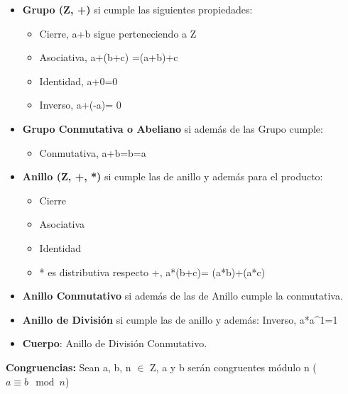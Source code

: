 \documentclass[12pt, twoside, openright]{report} %
\begin{document}
  \begin{itemize}
  \item \textbf{Grupo (Z, +)} si cumple las siguientes propiedades:
    

    \begin{itemize}
    \item Cierre, a+b sigue perteneciendo a Z
      
    \item Asociativa, a+(b+c) =(a+b)+c
      
    \item Identidad, a+0=0
      
    \item Inverso, a+(-a)= 0
      
    \end{itemize}
  \item \textbf{Grupo Conmutativa o Abeliano} si además de las Grupo cumple:
    

    \begin{itemize}
    \item Conmutativa, a+b=b=a
      
    \end{itemize}
  \item \textbf{Anillo (Z, +, *)} si cumple las de anillo y además para el
    producto:
    

    \begin{itemize}
    \item Cierre
      
    \item Asociativa
      
    \item Identidad
      
    \item * es distributiva respecto +, a*(b+c)= (a*b)+(a*c)
      
    \end{itemize}
  \item \textbf{Anillo Conmutativo} si además de las de Anillo cumple la
    conmutativa.
    
  \item \textbf{Anillo de División} si cumple las de anillo y además:
    Inverso, a*a\^{}1=1
    
  \item \textbf{Cuerpo}: Anillo de División Conmutativo.
    
  \end{itemize}

  
  \textbf{Congruencias:} Sean a, b, n $\in$ Z, a y b serán congruentes
  módulo n ($a \equiv b  \mod n$)
  
\end{document}
